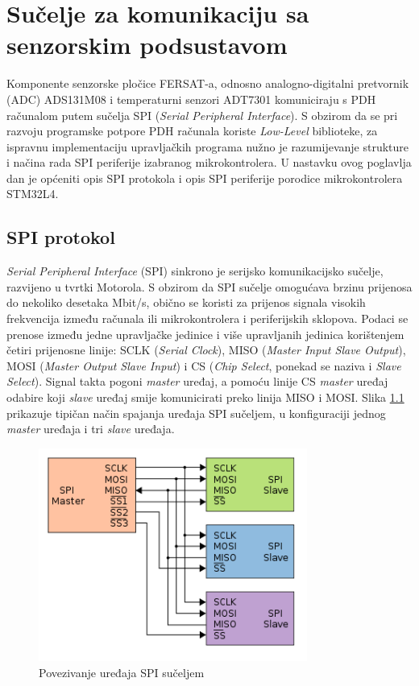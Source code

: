 \chapter{Sučelje za komunikaciju sa senzorskim podsustavom}
	Komponente senzorske pločice FERSAT-a, odnosno analogno-digitalni pretvornik (ADC) ADS131M08 i temperaturni senzori ADT7301 komuniciraju s PDH računalom putem sučelja SPI (\textit{Serial Peripheral Interface}). S obzirom da se pri razvoju programske potpore PDH računala koriste \textit{Low-Level} biblioteke, za ispravnu implementaciju upravljačkih programa nužno je razumijevanje strukture i načina rada SPI periferije izabranog mikrokontrolera. U nastavku ovog poglavlja dan je općeniti opis SPI protokola i opis SPI periferije porodice mikrokontrolera STM32L4.
	
	\section{SPI protokol}
		\textit{Serial Peripheral Interface} (SPI) sinkrono je serijsko komunikacijsko sučelje, razvijeno u tvrtki Motorola. S obzirom da SPI sučelje omogućava brzinu prijenosa do nekoliko desetaka Mbit/s, obično se koristi za prijenos signala visokih frekvencija između računala ili mikrokontrolera i periferijskih sklopova. Podaci se prenose između jedne upravljačke jedinice  i više upravljanih jedinica  korištenjem četiri prijenosne linije: SCLK (\textit{Serial Clock}), MISO (\textit{Master Input Slave Output}), MOSI (\textit{Master Output Slave Input}) i CS (\textit{Chip Select}, ponekad se naziva i \textit{Slave Select}). Signal takta pogoni \textit{master} uređaj, a pomoću linije CS \textit{master} uređaj odabire koji \textit{slave} uređaj smije komunicirati preko linija MISO i MOSI. Slika \ref{fig:spi} prikazuje tipičan način spajanja uređaja SPI sučeljem, u konfiguraciji jednog \textit{master} uređaja i tri \textit{slave} uređaja.
		
		\begin{figure}[htb]
			\centering
			\includegraphics[height=7cm]{slike/spi.png}
			\caption{Povezivanje uređaja SPI sučeljem \cite{spi_wikipedia}}
			\label{fig:spi}
		\end{figure}
	

